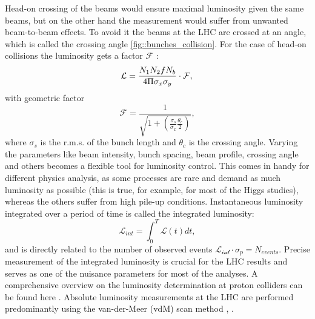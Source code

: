 	Head-on crossing of the beams would ensure maximal luminosity given the same beams, but on the other hand the measurement would suffer from unwanted beam-to-beam effects. To avoid it the beams at the LHC are crossed at an angle, which is called the crossing angle \ref{fig::bunches_collision}. 
	For the case of head-on collisions the luminosity gets a factor $\mathcal{F} $ \cite{Lumi}:
	\begin{equation}
	\mathcal{L} = \frac{N_1N_2fN_b}{4\Pi \sigma_x \sigma_y} \cdot \mathcal{F},\\
	\end{equation}
	with geometric factor
	\begin{equation}
	\nonumber
	\mathcal{F} = \frac{1}{\sqrt{ 1+\left(  \frac{\sigma_s}{\sigma_x}  \frac{\theta_c}{2} \right) }},
	\end{equation}
	where $\sigma_s$ is the r.m.s. of the bunch length and $\theta_c$ is the crossing angle. Varying the parameters like beam intensity, bunch spacing, beam profile, crossing angle and others becomes a flexible tool for luminosity control. This comes in handy for different physics analysis, as some processes are rare and demand as much luminosity as possible (this is true, for example, for most of the Higgs studies), whereas the others suffer from high pile-up conditions.
	Instantaneous luminosity integrated over a period of time is called the integrated luminosity:
	\begin{equation}
	\mathcal{L}_{int} = \int_0^{T} \mathcal{L}(t) dt,
	\end{equation}
	and is directly related to the number of observed events $\mathcal{L_{int}} \cdot \sigma_p = N_{events}$. Precise measurement of the integrated luminosity is crucial for the LHC results and serves as one of the nuisance parameters for most of the analyses. A comprehensive overview on the luminosity determination at proton colliders can be found here \cite{lumi_witold}. Absolute luminosity measurements at the LHC are performed predominantly using the van-der-Meer (vdM) scan method \cite{vdm1}, \cite{vdm2}. 
	
